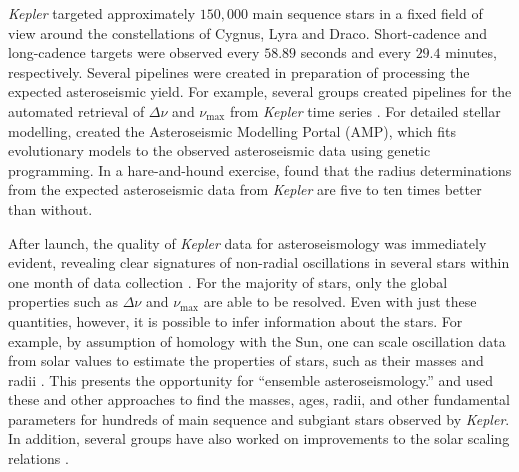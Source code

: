 \emph{Kepler} targeted approximately $150,000$ main sequence stars in a fixed field of view around the constellations of Cygnus, Lyra and Draco. 
Short-cadence and long-cadence targets were observed every $58.89$ seconds and every $29.4$ minutes, respectively. 
Several pipelines were created in preparation of processing the expected asteroseismic yield. 
For example, several groups created pipelines for the automated retrieval of ${\Delta\nu}$ and $\nu_{\max}$ from \emph{Kepler} time series \citep[e.g.,][]{2009CoAst.160...74H, 2009A&A...508..877M, 2010MNRAS.402.2049H, 2010A&A...511A..46M}. 
For detailed stellar modelling, \citet{2009ApJ...699..373M} created the Asteroseismic Modelling Portal (AMP), which fits evolutionary models to the observed asteroseismic data using genetic programming. 
In a hare-and-hound exercise, \citet{2009ApJ...700.1589S} found that the radius determinations from the expected asteroseismic data from \emph{Kepler} are five to ten times better than without. 


After launch, the quality of \emph{Kepler} data for asteroseismology was immediately evident, revealing clear signatures of non-radial oscillations in several stars within one month of data collection \citep{2010PASP..122..131G, 2010ApJ...713L.169C}. 
For the majority of stars, only the global properties such as ${\Delta\nu}$ and $\nu_{\max}$ are able to be resolved. 
Even with just these quantities, however, it is possible to infer information about the stars. 
For example, by assumption of homology with the Sun, one can scale oscillation data from solar values to estimate the properties of stars, such as their masses and radii \citep[e.g.,][]{1995A&A...293...87K}. %
This presents the opportunity for ``ensemble asteroseismology.''
\citet{2011Sci...332..213C, 2014ApJS..210....1C} and \citet{2017ApJS..233...23S} used these and other approaches to find the masses, ages, radii, and other fundamental parameters for hundreds of main sequence and subgiant stars observed by \emph{Kepler}. 
In addition, several groups have also worked on improvements to the solar scaling relations \citep[e.g.,][]{2013A&A...550A.126M,2016ApJ...822...15S,2016MNRAS.460.4277G,2017MNRAS.470.2069G,2017ApJ...843...11V}. 


